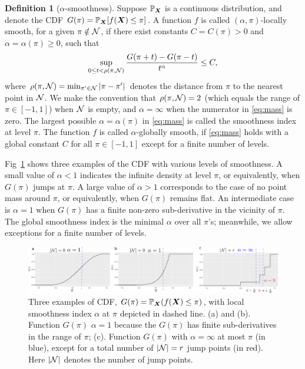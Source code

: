 \documentclass[11pt]{article}
\theoremstyle{plain}
\theoremstyle{definition}
\newtheorem{defn}{Definition}
\begin{document}
\begin{defn} [$\alpha$-smoothness] \label{ass:decboundary} 
Suppose $\mathbb{P}_{\bm X}$ is a continuous distribution, and denote the CDF $G(\pi)=\mathbb{P}_{\bm X}[f(\bm X)\leq \pi]$. A function $f$ is called $(\alpha,\pi)$-locally smooth, for a given $\pi \notin \mathcal{N}$, if there exist constants $C=C(\pi)>0$ and $\alpha=\alpha(\pi)\geq 0$, such that
\begin{equation}\label{eq:mass}
\sup_{0\leq t<\rho(\pi, \mathcal{N})}{G(\pi+t)-G(\pi-t)\over t^{\alpha}}\leq C,
\end{equation}
where $\rho(\pi,\mathcal{N}) = \min_{\pi'\in \mathcal{N}} |\pi-\pi'|$ denotes the distance from $\pi$ to the nearest point in $\mathcal{N}$. We make the convention that $\rho(\pi,\mathcal{N})=2$ (which equals the range of $\pi\in[-1,1]$) when $\mathcal{N}$ is empty, and $\alpha=\infty$ when the numerator in \eqref{eq:mass} is zero. The largest possible $\alpha=\alpha(\pi)$ in \eqref{eq:mass} is called the smoothness index at level $\pi$. The function $f$ is called $\alpha$-globally smooth, if \eqref{eq:mass} holds with a global constant $C$ for all $\pi\in[-1,1]$ except for a finite number of levels.
\end{defn}

\noindent
Fig~\ref{fig:CDF} shows three examples of the CDF with various levels of smoothness. A small value of $\alpha<1$ indicates the infinite density at level $\pi$, or equivalently, when $G(\pi)$ jumps at $\pi$. A large value of $\alpha>1$ corresponds to the case of no point mass around $\pi$, or equivalently, when $G(\pi)$ remains flat. An intermediate case is $\alpha=1$ when $G(\pi)$ has a finite non-zero sub-derivative in the vicinity of $\pi$. The global smoothness index is the minimal $\alpha$ over all $\pi$'s; meanwhile, we allow exceptions for a finite number of levels. 

\begin{figure}[t]
\includegraphics[width=.95\textwidth]{figure/cdf_new.pdf}
\caption{Three examples of CDF, $G(\pi)=\mathbb{P}_{\bm X}(f(\bm X)\leq \pi)$, with local smoothness index $\alpha$ at $\pi$ depicted in dashed line. (a) and (b). Function $G(\pi)$ $\alpha=1$ because the $G(\pi)$ has finite sub-derivatives in the range of $\pi$; (c). Function $G(\pi)$ with $\alpha=\infty$ at most $\pi$ (in blue), except for a total number of $|\mathcal{N}|=r$ jump points (in red). Here $|\mathcal{N}|$ denotes the number of jump points.}
\label{fig:CDF}
\end{figure}
\end{document}
